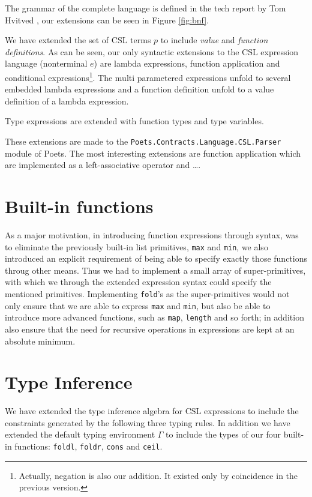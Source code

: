 \documentclass[10pt,a4paper,final,oneside,openany,article]{memoir}
\begin{document}
The grammar of the complete language is defined in the tech report by
Tom Hvitved \cite[p. 13]{hvitved10}, our extensions can be seen in
Figure \ref{fig:bnf}. 

We have extended the set of CSL terms $p$ to include \textit{value}
and \textit{function definitions}.  As can be seen, our only syntactic
extensions to the CSL expression language (nonterminal $e$) are lambda
expressions, function application and conditional
expressions\footnote{Actually, negation is also our addition. It
  existed only by coincidence in the previous version.}. The multi
parametered expressions unfold to several embedded lambda expressions
and a function definition unfold to a value definition of a lambda
expression.

Type expressions are extended with function types and type
variables.

These extensions are made to the
\texttt{Poets.Contracts.Language.CSL.Parser} module of Poets. The most
interesting extensions are function application which are implemented
as a left-associative operator and \ldots.  

\section{Built-in functions}
As a major motivation, in introducing function expressions through
syntax, was to eliminate the previously built-in list primitives,
\lstinline{max} and \lstinline{min}, we also introduced an explicit
requirement of being able to specify exactly those functions throug
other means. Thus we had to implement a small array of super-primitives,
with which we through the extended expression syntax could specify the
mentioned primitives. Implementing \lstinline{fold}'s as the
super-primitives would not only ensure that we are able to express 
\lstinline{max} and \lstinline{min}, but also be able to introduce more
advanced functions, such as \lstinline{map}, \lstinline{length} and so 
forth; in addition also ensure that the need for recursive operations
in expressions are kept at an absolute minimum.

\section{Type Inference}
We have extended the type inference algebra for CSL expressions to
include the constraints generated by the following three typing rules.
In addition we have extended the default typing environment $\Gamma$
to include the types of our four built-in functions:
\lstinline{foldl}, \lstinline{foldr}, \lstinline{cons} and
\lstinline{ceil}.
\end{document}
